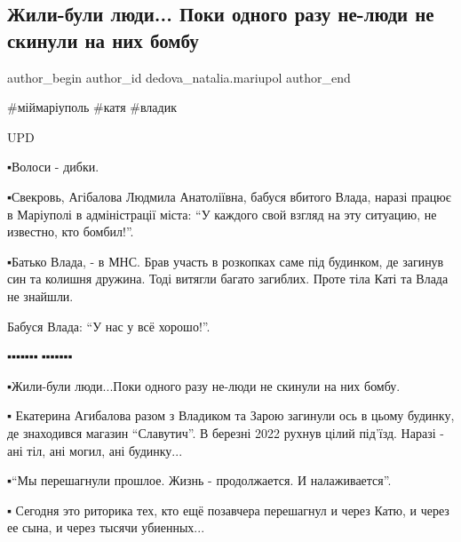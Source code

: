  
 
 
 
 

\subsection{Жили-були люди... Поки одного разу не-люди не скинули на них бомбу}
\label{sec:01_02_2023.fb.dedova_natalia.mariupol.1.zhili_buli_lyudi__po}

\ifcmt
 author_begin
   author_id dedova_natalia.mariupol
 author_end
\fi

\obeycr
\#міймаріуполь 
\#катя
\#владик
\restorecr

UPD 

▪️Волоси - дибки.

▪️Свекровь, Агібалова Людмила Анатоліївна, бабуся вбитого Влада, наразі працює в
Маріуполі в адміністрації міста: \enquote{У каждого свой взгляд на эту ситуацию, не
известно, кто бомбил!}. 

▪️Батько Влада, - в МНС. Брав участь в розкопках саме під будинком, де загинув
син та колишня дружина. Тоді витягли багато загиблих. Проте тіла Каті та Влада
не знайшли. 

Бабуся Влада: \enquote{У нас у всё хорошо!}. 

▪️▪️▪️▪️▪️▪️▪️🖤▪️▪️▪️▪️▪️▪️▪️

▪️Жили-були люди...Поки одного разу не-люди не скинули на них бомбу. 

▪️ Екатерина Агибалова разом з Владиком та Зарою загинули ось в цьому будинку,
де знаходився магазин \enquote{Славутич}. В березні 2022 рухнув цілий під'їзд. Наразі -
ані тіл, ані могил, ані будинку...

▪️\enquote{Мы перешагнули прошлое. Жизнь - продолжается. И налаживается}. 

▪️ Сегодня это риторика тех, кто ещё позавчера перешагнул и через Катю, и через
ее сына, и через тысячи убиенных...

